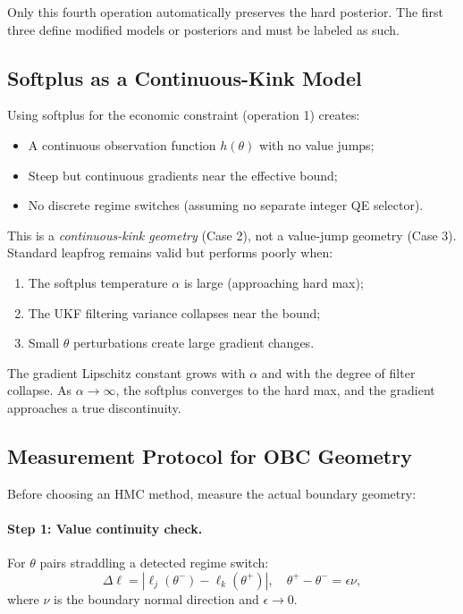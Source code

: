 Only this fourth operation automatically preserves the hard posterior. The
first three define modified models or posteriors and must be labeled as such.

\subsection{Softplus as a Continuous-Kink Model}

Using softplus for the economic constraint (operation 1) creates:
\begin{itemize}
  \item A continuous observation function $h(\theta)$ with no value jumps;
  \item Steep but continuous gradients near the effective bound;
  \item No discrete regime switches (assuming no separate integer QE selector).
\end{itemize}

This is a \emph{continuous-kink geometry} (Case 2), not a value-jump geometry
(Case 3). Standard leapfrog remains valid but performs poorly when:
\begin{enumerate}
  \item The softplus temperature $\alpha$ is large (approaching hard max);
  \item The UKF filtering variance collapses near the bound;
  \item Small $\theta$ perturbations create large gradient changes.
\end{enumerate}

The gradient Lipschitz constant grows with $\alpha$ and with the degree of
filter collapse. As $\alpha \to \infty$, the softplus converges to the hard
max, and the gradient approaches a true discontinuity.

\subsection{Measurement Protocol for OBC Geometry}

Before choosing an HMC method, measure the actual boundary geometry:

\paragraph{Step 1: Value continuity check.}
For $\theta$ pairs straddling a detected regime switch:
\begin{equation}
  \Delta \ell = |\ell_j(\theta^-) - \ell_k(\theta^+)|, \quad \theta^+ - \theta^- = \epsilon \nu,
  \label{eq:value-jump-check}
\end{equation}
where $\nu$ is the boundary normal direction and $\epsilon \to 0$.

